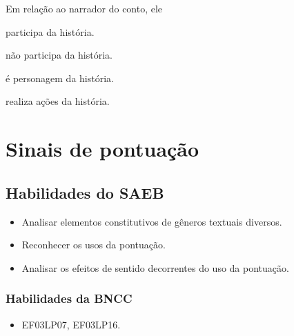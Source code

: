 Em relação ao narrador do conto, ele

\begin{escolha}[itemsep=-5pt]
\item participa da história.

\item não participa da história.

\item é personagem da história.

\item realiza ações da história.
\end{escolha}

\chapter{Sinais de pontuação}


\section{Habilidades do SAEB}

\begin{itemize}
  \item Analisar elementos constitutivos de gêneros textuais diversos.
  \item Reconhecer os usos da pontuação.
  \item Analisar os efeitos de sentido decorrentes do uso da pontuação.
\end{itemize}

\subsection{Habilidades da BNCC}

\begin{itemize}
  \item EF03LP07, EF03LP16.
\end{itemize}

